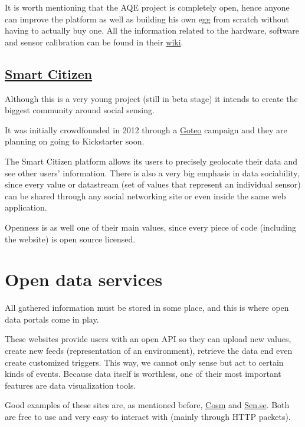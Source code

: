 It is worth mentioning that the AQE project is completely open, hence anyone can improve the platform as well as building his own egg from scratch without having to actually buy one. All the information related to the hardware, software and sensor calibration can be found in their \href{http://airqualityegg.wikispaces.org}{wiki}.

\subsection{\href{http://beta.smartcitizen.me}{Smart Citizen}}

Although this is a very young project (still in beta stage) it intends to create the biggest community around social sensing.

It was initially crowdfounded in 2012 through a \href{http://goteo.org/project/smart-citizen-sensores-ciudadanos}{Goteo} campaign and they are planning on going to Kickstarter soon.

The Smart Citizen platform allows its users to precisely geolocate their data and see other users' information. There is also a very big emphasis in data sociability, since every value or datastream (set of values that represent an individual sensor) can be shared through any social networking site or even inside the same web application.

Openness is as well one of their main values, since every piece of code (including the website) is open source licensed.


\section{Open data services}

All gathered information must be stored in some place, and this is where open data portals come in play. 

These websites provide users with an open API so they can upload new values, create new feeds (representation of an environment), retrieve the data end even create customized triggers. This way, we cannot only sense but act to certain kinds of events. Because data itself is worthless, one of their most important features are data visualization tools.

Good examples of these sites are, as mentioned before, \href{http://www.cosm.com}{Cosm} and \href{http://open.sen.se/}{Sen.se}. Both are free to use and very easy to interact with (mainly through HTTP packets).
